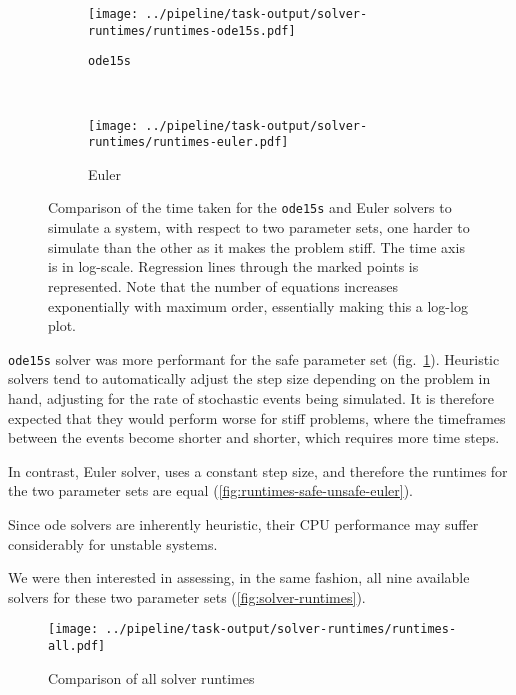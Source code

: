 \begin{figure}[tb]
   \centering
   \begin{subfigure}[t]{0.45\textwidth}
       \texttt{[image: ../pipeline/task-output/solver-runtimes/runtimes-ode15s.pdf]}
       \caption{\texttt{ode15s}}
       \label{fig:runtimes-safe-unsafe-ode15s}
   \end{subfigure}
   ~
   \begin{subfigure}[t]{0.45\textwidth}
       \texttt{[image: ../pipeline/task-output/solver-runtimes/runtimes-euler.pdf]}
       \caption{Euler}
       \label{fig:runtimes-safe-unsafe-euler}
   \end{subfigure}
   
    \caption{Comparison of the time taken for the {\tt ode15s} and Euler solvers to simulate a system, with respect to two parameter sets, one harder to simulate than the other as it makes the problem stiff.
    The time axis is in log-scale. Regression lines through the marked points is represented.
    Note that the number of equations increases exponentially with maximum order, essentially making this a log-log plot.}
\label{fig:runtimes-safe-unsafe}
\end{figure}

\texttt{ode15s} solver was more performant for the safe parameter set (fig.~\ref{fig:runtimes-safe-unsafe-ode15s}).
Heuristic solvers tend to automatically adjust the step size depending on the problem in hand, adjusting for the rate of stochastic events being simulated.
It is therefore expected that they would perform worse for stiff problems, where the timeframes between the events become shorter and shorter, which requires more time steps.

In contrast, Euler solver, uses a constant step size, and therefore the runtimes for the two parameter sets are equal (\autoref{fig:runtimes-safe-unsafe-euler}).

Since \gls{ode} solvers are inherently heuristic, their CPU performance may suffer considerably for unstable systems.

We were then interested in assessing, in the same fashion, all nine available solvers for these two parameter sets (\autoref{fig:solver-runtimes}).

\begin{figure}[bt]
    \centering
    \texttt{[image: ../pipeline/task-output/solver-runtimes/runtimes-all.pdf]}
    \caption{Comparison of all solver runtimes}
    \label{fig:solver-runtimes}
\end{figure}

